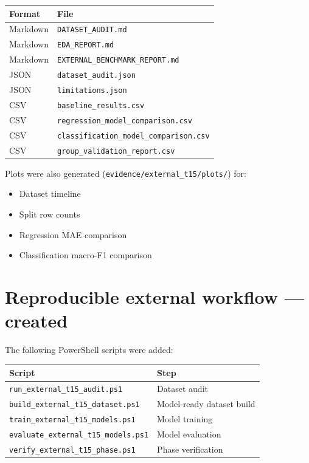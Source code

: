 \documentclass[11pt,a4paper]{article}
\begin{document}
\begin{center}
\begin{tabular}{ll}
\toprule
\textbf{Format} & \textbf{File} \\
\midrule
Markdown & \texttt{DATASET\_AUDIT.md} \\
Markdown & \texttt{EDA\_REPORT.md} \\
Markdown & \texttt{EXTERNAL\_BENCHMARK\_REPORT.md} \\
JSON     & \texttt{dataset\_audit.json} \\
JSON     & \texttt{limitations.json} \\
CSV      & \texttt{baseline\_results.csv} \\
CSV      & \texttt{regression\_model\_comparison.csv} \\
CSV      & \texttt{classification\_model\_comparison.csv} \\
CSV      & \texttt{group\_validation\_report.csv} \\
\bottomrule
\end{tabular}
\end{center}

\noindent Plots were also generated (\texttt{evidence/external\_t15/plots/}) for:
\begin{itemize}[leftmargin=2em,itemsep=2pt]
  \item Dataset timeline
  \item Split row counts
  \item Regression MAE comparison
  \item Classification macro-F1 comparison
\end{itemize}

\section{Reproducible external workflow --- created}

The following PowerShell scripts were added:

\begin{center}
\begin{tabular}{ll}
\toprule
\textbf{Script} & \textbf{Step} \\
\midrule
\texttt{run\_external\_t15\_audit.ps1}        & Dataset audit \\
\texttt{build\_external\_t15\_dataset.ps1}    & Model-ready dataset build \\
\texttt{train\_external\_t15\_models.ps1}     & Model training \\
\texttt{evaluate\_external\_t15\_models.ps1}  & Model evaluation \\
\texttt{verify\_external\_t15\_phase.ps1}     & Phase verification \\
\bottomrule
\end{tabular}
\end{center}
\end{document}
